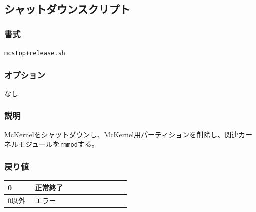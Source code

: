 \documentclass[twoside,11pt,fleqn]{book}
\begin{document}
\subsection{シャットダウンスクリプト}
\subsubsection*{書式}{\quad} \texttt{mcstop+release.sh}
\subsubsection*{オプション}{\quad}
なし
\subsubsection*{説明}{\quad} 
McKernelをシャットダウンし、McKernel用パーティションを削除し、関連カーネルモジュールを\texttt{rmmod}する。
\subsubsection*{戻り値}
\begin{table}[!ht]
\footnotesize
\begin{tabular}{|p{0.20\linewidth}|p{0.70\linewidth}|} \hline
0&正常終了\\ \hline
0以外&エラー\\ \hline
\end{tabular}
\vspace{-0em}
\end{table}
\FloatBarrier
\end{document}
